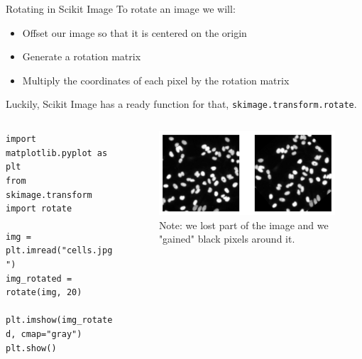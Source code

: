 \documentclass[9pt, aspectratio=169]{beamer}
\begin{document}
\begin{frame}
    {Rotating in Scikit Image}
    To rotate an image we will:
    \begin{itemize}
        \item Offset our image so that it is centered on the origin
        \item Generate a rotation matrix
        \item Multiply the coordinates of each pixel by the rotation matrix
    \end{itemize}
    \pause
    Luckily, Scikit Image has a ready function for that, \texttt{skimage.transform.rotate}.

    \begin{columns}
        \begin{column}{0.5\textwidth}
            \begin{codebox}
                \texttt{import matplotlib.pyplot as plt\\
                    from skimage.transform import rotate\\
                    \\
                    img = plt.imread("cells.jpg")\\
                    img\_rotated = rotate(img, 20)\\
                    \\
                    plt.imshow(img\_rotated, cmap="gray")\\
                    plt.show()}
            \end{codebox}
        \end{column}
        \begin{column}{0.5\textwidth}
            \begin{figure}
                \includegraphics[width=\textwidth]{rotate_image.png}
                \caption{Note: we lost part of the image and we "gained" black pixels around it.}
            \end{figure}
        \end{column}
    \end{columns}
\end{frame}
\end{document}
